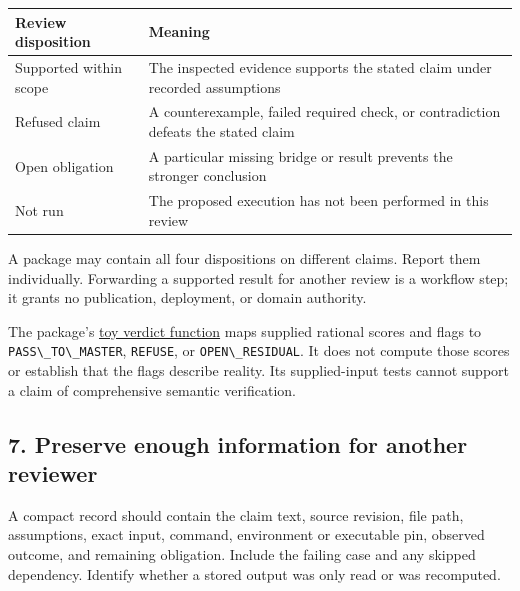 \documentclass[
  11pt,
]{article}
\newcommand{\passthrough}[1]{#1}
\begin{document}
\begin{longtable}[]{@{}
  >{\raggedright\arraybackslash}p{}
  >{\raggedright\arraybackslash}p{}@{}}
\toprule\noalign{}
\begin{minipage}[b]{\linewidth}\raggedright
Review disposition
\end{minipage} & \begin{minipage}[b]{\linewidth}\raggedright
Meaning
\end{minipage} \\
\midrule\noalign{}
\endhead
\bottomrule\noalign{}
\endlastfoot
Supported within scope & The inspected evidence supports the stated
claim under recorded assumptions \\
Refused claim & A counterexample, failed required check, or
contradiction defeats the stated claim \\
Open obligation & A particular missing bridge or result prevents the
stronger conclusion \\
Not run & The proposed execution has not been performed in this
review \\
\end{longtable}

A package may contain all four dispositions on different claims. Report
them individually. Forwarding a supported result for another review is a
workflow step; it grants no publication, deployment, or domain
authority.

The package's
\href{https://github.com/dbccpage/the_symbol_game/blob/52cb5457f6c485ba548cfd292f6012a941ed22cf/atlas/coda_atlas/symbol_game/009_pfp_adversarial_dialectics_and_terminal_reality_gates/code/tests/test_009_adversarial_reality_gate.py}{toy
verdict function} maps supplied rational scores and flags to
\passthrough{\lstinline!PASS\_TO\_MASTER!},
\passthrough{\lstinline!REFUSE!}, or
\passthrough{\lstinline!OPEN\_RESIDUAL!}. It does not compute those
scores or establish that the flags describe reality. Its supplied-input
tests cannot support a claim of comprehensive semantic verification.

\subsection{7. Preserve enough information for another
reviewer}\label{preserve-enough-information-for-another-reviewer}

A compact record should contain the claim text, source revision, file
path, assumptions, exact input, command, environment or executable pin,
observed outcome, and remaining obligation. Include the failing case and
any skipped dependency. Identify whether a stored output was only read
or was recomputed.
\end{document}
